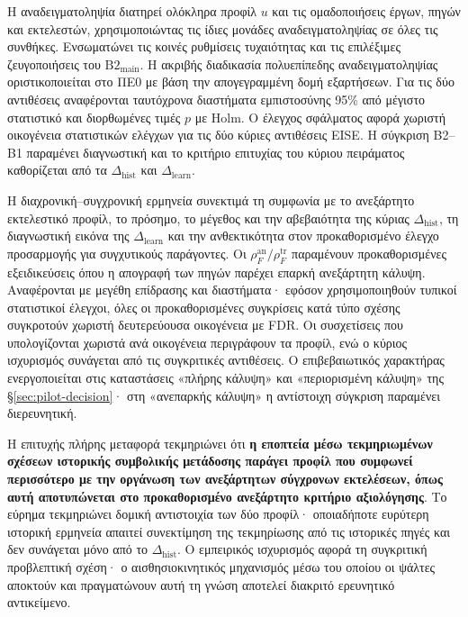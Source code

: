 \documentclass[11pt,a4paper]{article}
\begin{document}
Η αναδειγματοληψία διατηρεί ολόκληρα προφίλ $u$ και τις ομαδοποιήσεις έργων, πηγών και εκτελεστών, χρησιμοποιώντας τις ίδιες μονάδες αναδειγματοληψίας σε όλες τις συνθήκες. Ενσωματώνει τις κοινές ρυθμίσεις τυχαιότητας και τις επιλέξιμες ζευγοποιήσεις του $\mathrm{B2}_{\mathrm{main}}$. Η ακριβής διαδικασία πολυεπίπεδης αναδειγματοληψίας οριστικοποιείται στο ΠΕ0 με βάση την απογεγραμμένη δομή εξαρτήσεων. Για τις δύο αντιθέσεις αναφέρονται ταυτόχρονα διαστήματα εμπιστοσύνης 95\% από μέγιστο στατιστικό και διορθωμένες τιμές $p$ με Holm. Ο έλεγχος σφάλματος αφορά χωριστή οικογένεια στατιστικών ελέγχων για τις δύο κύριες αντιθέσεις EISE. Η σύγκριση B2--B1 παραμένει διαγνωστική και το κριτήριο επιτυχίας του κύριου πειράματος καθορίζεται από τα $\Delta_{\mathrm{hist}}$ και $\Delta_{\mathrm{learn}}$.

Η διαχρονική--συγχρονική ερμηνεία συνεκτιμά τη συμφωνία με το ανεξάρτητο εκτελεστικό προφίλ, το πρόσημο, το μέγεθος και την αβεβαιότητα της κύριας $\Delta_{\mathrm{hist}}$, τη διαγνωστική εικόνα της $\Delta_{\mathrm{learn}}$ και την ανθεκτικότητα στον προκαθορισμένο έλεγχο προσαρμογής για συγχυτικούς παράγοντες. Οι $\rho_F^{\mathrm{an}}/\rho_F^{\mathrm{tr}}$ παραμένουν προκαθορισμένες εξειδικεύσεις όπου η απογραφή των πηγών παρέχει επαρκή ανεξάρτητη κάλυψη. Αναφέρονται με μεγέθη επίδρασης και διαστήματα· εφόσον χρησιμοποιηθούν τυπικοί στατιστικοί έλεγχοι, όλες οι προκαθορισμένες συγκρίσεις κατά τύπο σχέσης συγκροτούν χωριστή δευτερεύουσα οικογένεια με FDR. Οι συσχετίσεις που υπολογίζονται χωριστά ανά οικογένεια περιγράφουν τα προφίλ, ενώ ο κύριος ισχυρισμός συνάγεται από τις συγκριτικές αντιθέσεις. Ο επιβεβαιωτικός χαρακτήρας ενεργοποιείται στις καταστάσεις «πλήρης κάλυψη» και «περιορισμένη κάλυψη» της \S\ref{sec:pilot-decision}· στη «ανεπαρκής κάλυψη» η αντίστοιχη σύγκριση παραμένει διερευνητική.

Η επιτυχής πλήρης μεταφορά τεκμηριώνει ότι \textbf{η εποπτεία μέσω τεκμηριωμένων σχέσεων ιστορικής συμβολικής μετάδοσης παράγει προφίλ που συμφωνεί περισσότερο με την οργάνωση των ανεξάρτητων σύγχρονων εκτελέσεων, όπως αυτή αποτυπώνεται στο προκαθορισμένο ανεξάρτητο κριτήριο αξιολόγησης}. Το εύρημα τεκμηριώνει δομική αντιστοιχία των δύο προφίλ· οποιαδήποτε ευρύτερη ιστορική ερμηνεία απαιτεί συνεκτίμηση της τεκμηρίωσης από τις ιστορικές πηγές και δεν συνάγεται μόνο από το $\Delta_{\mathrm{hist}}$. Ο εμπειρικός ισχυρισμός αφορά τη συγκριτική προβλεπτική σχέση· ο αισθησιοκινητικός μηχανισμός μέσω του οποίου οι ψάλτες αποκτούν και πραγματώνουν αυτή τη γνώση αποτελεί διακριτό ερευνητικό αντικείμενο.
\end{document}
